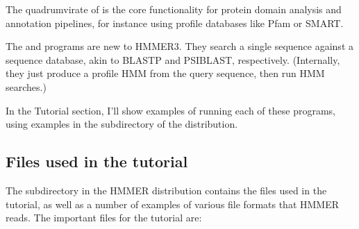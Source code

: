 The quadrumvirate of  is the
core functionality for protein domain analysis and annotation
pipelines, for instance using profile databases like Pfam or
SMART. 

The  and  programs are new to
HMMER3. They search a single sequence against a sequence database,
akin to BLASTP and PSIBLAST, respectively. (Internally, they just
produce a profile HMM from the query sequence, then run HMM searches.)

In the Tutorial section, I'll show examples of running each of these
programs, using examples in the  subdirectory of the
distribution.


\subsection{Files used in the tutorial}

The subdirectory  in the HMMER distribution contains the
files used in the tutorial, as well as a number of examples of various
file formats that HMMER reads. The important files for the tutorial
are:

